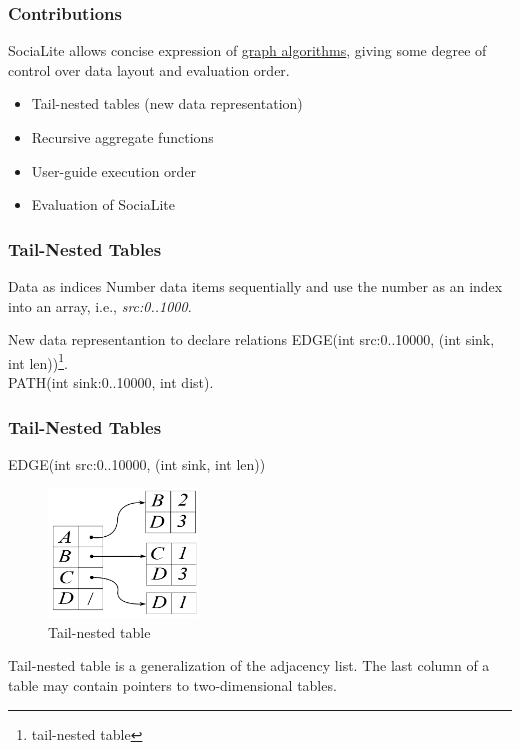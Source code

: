 \documentclass{beamer}
\begin{document}
\frame
{
	\frametitle{Contributions}

	SociaLite allows concise expression of \underline{graph algorithms}, giving some degree of control over data layout and evaluation order.
	\begin{itemize}
	\item Tail-nested tables (new data representation)
	\item Recursive aggregate functions
	\item User-guide execution order
	\item Evaluation of SociaLite
	\end{itemize}
}


\frame
{
	\frametitle{Tail-Nested Tables}
	
	\begin{block}{Data as indices}
		Number data items sequentially and use the number as an index into an array, i.e., \textit{src:0..1000}.
	\end{block}

	\begin{block}{New data representantion to declare relations}
	EDGE(int src:0..10000, (int sink, int len))\footnote{tail-nested table}. \\
	PATH(int sink:0..10000, int dist).
	\end{block}
	
}

\frame
{
	\frametitle{Tail-Nested Tables}

	\begin{block}{}
	\centering
	EDGE(int src:0..10000, (int sink, int len))
	\end{block}
	
	\begin{figure}
		\centering
		\includegraphics[width=4cm]{tail_nested_table.png}
		\caption{Tail-nested table}
	\end{figure}
	
	Tail-nested table is a generalization of the adjacency list. The last column of a table may contain pointers to two-dimensional tables.
}
\end{document}
